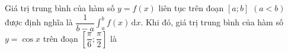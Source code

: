 \begin{ex}
Giá trị trung bình của hàm số $y=f(x)$ liên tục trên đoạn $[a;b]$ $(a<b)$ được định nghĩa là $\dfrac1{b-a}\displaystyle\int_a^bf(x)\,\mathrm dx$. Khi đó, giá trị trung bình của hàm số $y=\cos x$ trên đoạn $\left[\dfrac\pi6;\dfrac\pi2\right]$ là
\end{ex}
